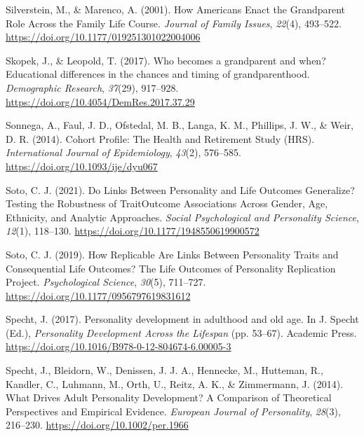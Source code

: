\documentclass[
  english,
  man, noextraspace]{apa7}
\begin{document}
\leavevmode\hypertarget{ref-silversteinHowAmericansEnact2001}{}%
Silverstein, M., \& Marenco, A. (2001). How Americans Enact the Grandparent Role Across the Family Life Course. \emph{Journal of Family Issues}, \emph{22}(4), 493--522. \url{https://doi.org/10.1177/019251301022004006}

\leavevmode\hypertarget{ref-skopekWhoBecomesGrandparent2017}{}%
Skopek, J., \& Leopold, T. (2017). Who becomes a grandparent and when? Educational differences in the chances and timing of grandparenthood. \emph{Demographic Research}, \emph{37}(29), 917--928. \url{https://doi.org/10.4054/DemRes.2017.37.29}

\leavevmode\hypertarget{ref-sonnegaCohortProfileHealth2014}{}%
Sonnega, A., Faul, J. D., Ofstedal, M. B., Langa, K. M., Phillips, J. W., \& Weir, D. R. (2014). Cohort Profile: The Health and Retirement Study (HRS). \emph{International Journal of Epidemiology}, \emph{43}(2), 576--585. \url{https://doi.org/10.1093/ije/dyu067}

\leavevmode\hypertarget{ref-sotoLinksPersonalityLife2021}{}%
Soto, C. J. (2021). Do Links Between Personality and Life Outcomes Generalize? Testing the Robustness of TraitOutcome Associations Across Gender, Age, Ethnicity, and Analytic Approaches. \emph{Social Psychological and Personality Science}, \emph{12}(1), 118--130. \url{https://doi.org/10.1177/1948550619900572}

\leavevmode\hypertarget{ref-sotoHowReplicableAre2019}{}%
Soto, C. J. (2019). How Replicable Are Links Between Personality Traits and Consequential Life Outcomes? The Life Outcomes of Personality Replication Project. \emph{Psychological Science}, \emph{30}(5), 711--727. \url{https://doi.org/10.1177/0956797619831612}

\leavevmode\hypertarget{ref-spechtPersonalityDevelopmentAdulthood2017}{}%
Specht, J. (2017). Personality development in adulthood and old age. In J. Specht (Ed.), \emph{Personality Development Across the Lifespan} (pp. 53--67). Academic Press. \url{https://doi.org/10.1016/B978-0-12-804674-6.00005-3}

\leavevmode\hypertarget{ref-spechtWhatDrivesAdult2014}{}%
Specht, J., Bleidorn, W., Denissen, J. J. A., Hennecke, M., Hutteman, R., Kandler, C., Luhmann, M., Orth, U., Reitz, A. K., \& Zimmermann, J. (2014). What Drives Adult Personality Development? A Comparison of Theoretical Perspectives and Empirical Evidence. \emph{European Journal of Personality}, \emph{28}(3), 216--230. \url{https://doi.org/10.1002/per.1966}
\end{document}
